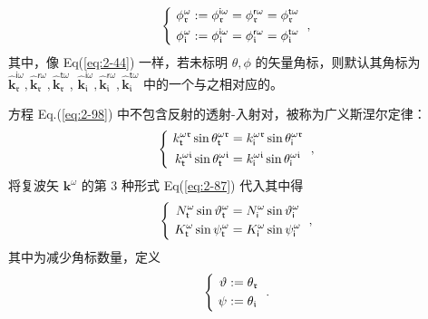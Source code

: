 \begin{equation} \label{eq:2-99}
	\abovedisplayskip=6pt
	\left\{\ \begin{aligned} \phi^{\omega}_{\mathfrak{r}} &:= \phi^{\mathsf{i}\omega}_{\mathfrak{r}} = \phi^{\mathsf{r}\omega}_{\mathfrak{r}} = \phi^{\mathsf{t}\omega}_{\mathfrak{r}} \\ \phi^{\omega}_{\mathfrak{i}} &:= \phi^{\mathsf{i}\omega}_{\mathfrak{i}} = \phi^{\mathsf{r}\omega}_{\mathfrak{i}} = \phi^{\mathsf{t}\omega}_{\mathfrak{i}} \end{aligned}\right. ~,
\end{equation}
其中，像 Eq(\ref{eq:2-44}) 一样，若未标明 $\theta, \phi$ 的矢量角标，则默认其角标为 $\hat{\symbf k}_{\mathfrak{r}}^{\mathsf{i}\omega},\hat{\symbf k}_{\mathfrak{r}}^{\mathsf{r}\omega},\hat{\symbf k}_{\mathfrak{r}}^{\mathsf{t}\omega}$, $\hat{\symbf k}_{\mathfrak{i}}^{\mathsf{i}\omega},\hat{\symbf k}_{\mathfrak{i}}^{\mathsf{r}\omega},\hat{\symbf k}_{\mathfrak{i}}^{\mathsf{t}\omega}$ 中的一个与之相对应的。

方程 Eq.(\ref{eq:2-98}) 中不包含反射的透射-入射对，被称为广义斯涅尔定律：
\begin{equation} \label{eq:2-100}
	\abovedisplayskip=12pt
	\belowdisplayskip=12pt
	\left\{\ \begin{aligned} {k}^{\omega\mathfrak{r}}_{\mathsf{t}} \sin \theta^{\omega\mathfrak{r}}_{\mathsf{t}} &= {k}^{\omega\mathfrak{r}}_{\mathsf{i}} \sin \theta^{\omega\mathfrak{r}}_{\mathsf{i}} \\ {k}^{\omega\mathfrak{i}}_{\mathsf{t}} \sin \theta^{\omega\mathfrak{i}}_{\mathsf{t}} &= {k}^{\omega\mathfrak{i}}_{\mathsf{i}} \sin \theta^{\omega\mathfrak{i}}_{\mathsf{i}} \end{aligned}\right. ~,
\end{equation}
将复波矢 ${\symbf k}^\omega$ 的第 3 种形式 Eq(\ref{eq:2-87}) 代入其中得
\begin{equation} \label{eq:2-101}
	\abovedisplayskip=12pt
	\belowdisplayskip=12pt
	\left\{\ \begin{aligned} N^{\omega}_{\mathsf{t}} \sin \vartheta^{\omega}_{\mathsf{t}} &= N^{\omega}_{\mathsf{i}} \sin \vartheta^{\omega}_{\mathsf{i}} \\ K^{\omega}_{\mathsf{t}} \sin \psi^{\omega}_{\mathsf{t}} &= K^{\omega}_{\mathsf{i}} \sin \psi^{\omega}_{\mathsf{i}} \end{aligned}\right. ~,
\end{equation}
其中为减少角标数量，定义
\begin{equation} \label{eq:2-102}
	\abovedisplayskip=12pt
	\belowdisplayskip=6pt
	\left\{\ \begin{aligned} \vartheta &:= \theta_{\mathfrak{r}} \\ \psi &:= \theta_{\mathfrak{i}} \end{aligned}\right. ~.
\end{equation}

